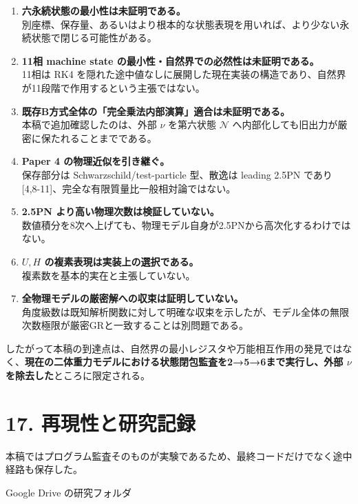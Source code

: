 \documentclass[
  a4paper,
]{ltjsarticle}
\begin{document}
\begin{enumerate}
\def\labelenumi{\arabic{enumi}.}
\item
  \textbf{六永続状態の最小性は未証明である。}\\
  別座標、保存量、あるいはより根本的な状態表現を用いれば、より少ない永続状態で閉じる可能性がある。
\item
  \textbf{11相 machine state
  の最小性・自然界での必然性は未証明である。}\\
  11相は RK4
  を隠れた途中値なしに展開した現在実装の構造であり、自然界が11段階で作用するという主張ではない。
\item
  \textbf{既存B方式全体の「完全乗法内部演算」適合は未証明である。}\\
  本稿で追加確認したのは、外部 \(\nu\) を第六状態 \(\mathcal N\)
  へ内部化しても旧出力が厳密に保たれることまでである。
\item
  \textbf{Paper 4 の物理近似を引き継ぐ。}\\
  保存部分は Schwarzschild/test-particle 型、散逸は leading 2.5PN であり
  {[}4,8-11{]}、完全な有限質量比一般相対論ではない。
\item
  \textbf{2.5PN より高い物理次数は検証していない。}\\
  数値積分を8次へ上げても、物理モデル自身が2.5PNから高次化するわけではない。
\item
  \textbf{\(U,H\) の複素表現は実装上の選択である。}\\
  複素数を基本的実在と主張していない。
\item
  \textbf{全物理モデルの厳密解への収束は証明していない。}\\
  角度級数は既知解析関数に対して明確な収束を示したが、モデル全体の無限次数極限が厳密GRと一致することは別問題である。
\end{enumerate}

したがって本稿の到達点は、自然界の最小レジスタや万能相互作用の発見ではなく、\textbf{現在の二体重力モデルにおける状態閉包監査を2→5→6まで実行し、外部
\(\nu\) を除去した}ところに限定される。

\section{17.
再現性と研究記録}\label{ux518dux73feux6027ux3068ux7814ux7a76ux8a18ux9332}

本稿ではプログラム監査そのものが実験であるため、最終コードだけでなく途中経路も保存した。

Google Drive の研究フォルダ
\end{document}
